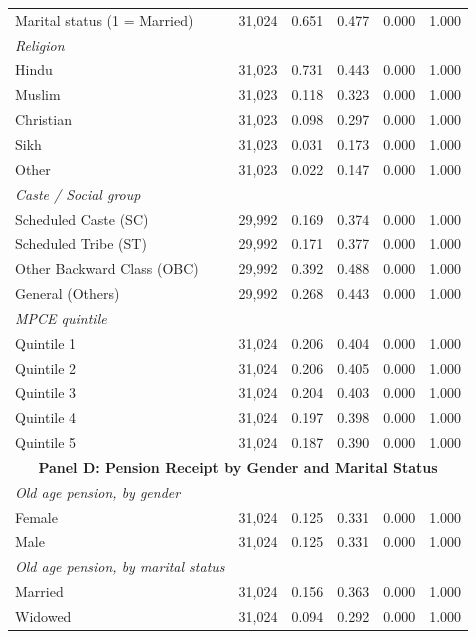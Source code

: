 \documentclass[
  11pt,
]{article}
\begin{document}
\begin{table}
{{\begin{tabular}{lrrrrr}
Marital status (1 = Married) & 31,024 & 0.651 & 0.477 & 0.000 & 1.000 \\
\textit{\quad Religion} & & & & & \\
\quad \quad Hindu & 31,023 & 0.731 & 0.443 & 0.000 & 1.000 \\
\quad \quad Muslim & 31,023 & 0.118 & 0.323 & 0.000 & 1.000 \\
\quad \quad Christian & 31,023 & 0.098 & 0.297 & 0.000 & 1.000 \\
\quad \quad Sikh & 31,023 & 0.031 & 0.173 & 0.000 & 1.000 \\
\quad \quad Other & 31,023 & 0.022 & 0.147 & 0.000 & 1.000 \\
\textit{\quad Caste / Social group} & & & & & \\
\quad \quad Scheduled Caste (SC) & 29,992 & 0.169 & 0.374 & 0.000 & 1.000 \\
\quad \quad Scheduled Tribe (ST) & 29,992 & 0.171 & 0.377 & 0.000 & 1.000 \\
\quad \quad Other Backward Class (OBC) & 29,992 & 0.392 & 0.488 & 0.000 & 1.000 \\
\quad \quad General (Others) & 29,992 & 0.268 & 0.443 & 0.000 & 1.000 \\
\textit{\quad MPCE quintile} & & & & & \\
\quad \quad Quintile 1 & 31,024 & 0.206 & 0.404 & 0.000 & 1.000 \\
\quad \quad Quintile 2 & 31,024 & 0.206 & 0.405 & 0.000 & 1.000 \\
\quad \quad Quintile 3 & 31,024 & 0.204 & 0.403 & 0.000 & 1.000 \\
\quad \quad Quintile 4 & 31,024 & 0.197 & 0.398 & 0.000 & 1.000 \\
\quad \quad Quintile 5 & 31,024 & 0.187 & 0.390 & 0.000 & 1.000 \\
\midrule
\multicolumn{6}{c}{\textbf{Panel D: Pension Receipt by Gender and Marital Status}} \\
\midrule
\textit{\quad Old age pension, by gender} & & & & & \\
\quad \quad Female & 31,024 & 0.125 & 0.331 & 0.000 & 1.000 \\
\quad \quad Male & 31,024 & 0.125 & 0.331 & 0.000 & 1.000 \\
\textit{\quad Old age pension, by marital status} & & & & & \\
\quad \quad Married & 31,024 & 0.156 & 0.363 & 0.000 & 1.000 \\
\quad \quad Widowed & 31,024 & 0.094 & 0.292 & 0.000 & 1.000 \\

\end{tabular}}}
\end{table}
\end{document}
